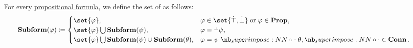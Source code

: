 \begin{definition}\label{def:propositional_subformula}
  For every \hyperref[def:propositional_syntax/formula]{propositional formula}, we define the set of  as follows:
  \begin{equation*}
    \op*{Subform}(\varphi) \coloneqq \begin{cases}
      \set{ \varphi },                                                        &\varphi \in \set{ \syntop, \synbot } \T{or} \varphi \in \op*{Prop}, \\
      \set{ \varphi } \bigcup \op*{Subform}(\psi),                            &\varphi = \synneg \psi, \\
      \set{ \varphi } \bigcup \op*{Subform}(\psi) \cup \op*{Subform}(\theta), &\varphi = \psi \syncirc \theta, {\syncirc} \in \op*{Conn}.
    \end{cases}
  \end{equation*}
\end{definition}

